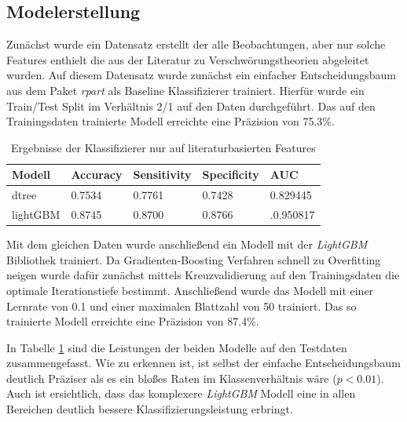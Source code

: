 \subsection{Modelerstellung}

Zunächst wurde ein Datensatz erstellt der alle Beobachtungen, aber nur solche Features enthielt die aus der Literatur zu Verschwörungstheorien abgeleitet wurden.
Auf diesem Datensatz wurde zunächst ein einfacher Entscheidungsbaum aus dem Paket \textit{rpart} \parencite[]{rpart} als Baseline Klassifizierer trainiert.
Hierfür wurde ein Train/Test Split im Verhältnis 2/1 auf den Daten durchgeführt.
Das auf den Trainingsdaten trainierte Modell erreichte eine Präzision von 75.3\%.


\begin{table}
    \begin{center}
        \begin{tabularx}{\textwidth}{XXXXX}
            \toprule
            Modell & Accuracy & Sensitivity & Specificity & AUC\\
            \midrule
            dtree & 0.7534 & 0.7761 & 0.7428 & 0.829445 \\
            lightGBM & 0.8745 & 0.8700 & 0.8766 & .0.950817 \\
            \bottomrule
        \end{tabularx}
        \caption{Ergebnisse der Klassifizierer nur auf literaturbasierten Features}
        \label{small-model}
    \end{center}
\end{table}


Mit dem gleichen Daten wurde anschließend ein Modell mit der \textit{LightGBM} Bibliothek\parencite[][]{lightgbm} trainiert.
Da Gradienten-Boosting Verfahren schnell zu Overfitting neigen wurde dafür zunächst mittels Kreuzvalidierung auf den Trainingsdaten die optimale Iterationstiefe bestimmt.
Anschließend wurde das Modell mit einer Lernrate von 0.1 und einer maximalen Blattzahl von 50 trainiert.
Das so trainierte Modell erreichte eine Präzision von 87.4\%.

In Tabelle \ref{small-model} sind die Leistungen der beiden Modelle auf den Testdaten zusammengefasst.
Wie zu erkennen ist, ist selbst der einfache Entscheidungsbaum deutlich Präziser als es ein bloßes Raten im Klassenverhältnis wäre ($p < 0.01$).
Auch ist ersichtlich, dass das komplexere \textit{LightGBM} Modell eine in allen Bereichen deutlich bessere Klassifizierungsleistung erbringt.

